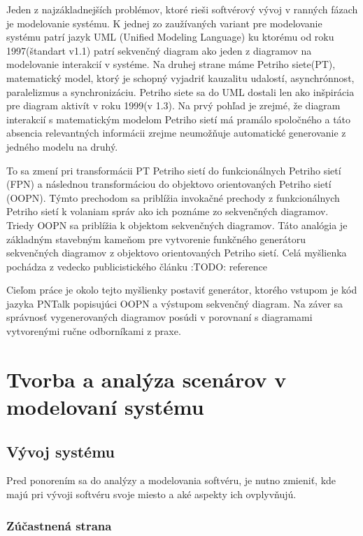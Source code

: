 Jeden z najzákladnejších problémov, ktoré rieši softvérový vývoj v ranných fázach je modelovanie systému. K jednej zo zaužívaných variant pre modelovanie systému patrí jazyk UML (Unified Modeling Language) ku ktorému od roku 1997(štandart v1.1) patrí sekvenčný diagram ako jeden z diagramov na modelovanie interakcií v systéme. Na druhej strane máme Petriho siete(PT), matematický model, ktorý je schopný vyjadriť kauzalitu udalostí, asynchrónnost, paralelizmus a synchronizáciu. Petriho siete sa do UML dostali len ako inšpirácia pre diagram aktivít v roku 1999(v 1.3). Na prvý pohľad je zrejmé, že diagram interakcií s matematickým modelom Petriho sietí má pramálo spoločného a táto absencia relevantných informácii zrejme neumožňuje automatické generovanie z jedného modelu na druhý. 

To sa zmení pri transformácii PT Petriho sietí do  funkcionálnych Petriho sietí (FPN) a následnou transformáciou do objektovo orientovaných Petriho sietí (OOPN). Týmto prechodom sa priblížia invokačné prechody z funkcionálnych Petriho sietí k volaniam správ ako ich poznáme zo sekvenčných diagramov. Triedy OOPN sa priblížia k objektom sekvenčných diagramov. Táto analógia je základným stavebným kameňom pre vytvorenie funkčného generátoru sekvenčných diagramov z objektovo orientovaných Petriho sietí. Celá myšlienka pochádza z vedecko publicistického článku :TODO: reference 

Cieľom práce je okolo tejto myšlienky postaviť generátor, ktorého vstupom je kód jazyka PNTalk popisujúci OOPN a výstupom sekvenčný diagram. Na záver sa správnosť vygenerovaných diagramov posúdi v porovnaní s diagramami vytvorenými ručne odborníkami z praxe.

\chapter{Tvorba a analýza scenárov v modelovaní systému}

\section{Vývoj systému}

Pred ponorením sa do analýzy a modelovania softvéru, je nutno zmieniť, kde majú pri vývoji softvéru svoje miesto a aké aspekty ich ovplyvňujú.

\subsection{Zúčastnená strana}

